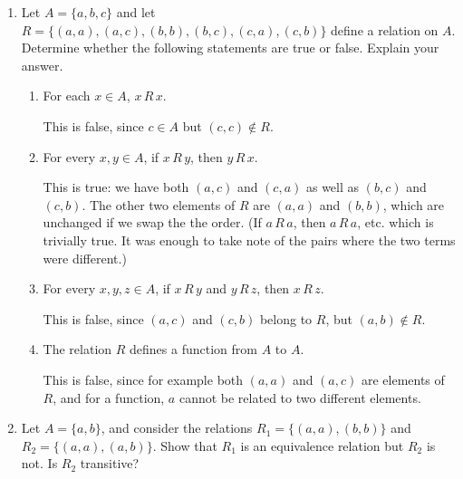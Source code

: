 \documentclass[12pt]{article}
\newcommand{\points}[1]{\marginpar{\hspace{24pt}[#1]}}
\newcommand{\R}[2]{#1\,R\,#2}
\begin{document}
\thispagestyle{fancy}

\bigskip


 \begin{enumerate}
\item Let $A = \{a,b,c\}$ and let $R=\{(a,a), (a,c), (b,b), (b,c), (c,a), (c,b)\}$ define a relation on $A$. Determine whether the following statements are true or false. Explain your answer.
\begin{enumerate}
 \item For each $x\in A$, $\R{x}{x}$. \points{1}

\bigskip

This is false, since $c\in A$ but $(c,c)\notin R$.

\bigskip

 \item For every $x,y\in A$, if $\R{x}{y}$, then $\R{y}{x}$. \points{2}

\bigskip

This is true: we have both $(a,c)$ and $(c,a)$ as well as $(b,c)$ and $(c,b)$. The other two elements of $R$ are $(a,a)$ and $(b,b)$, which are unchanged if we swap the the order. (If $a\,R\,a$, then $a\, R\,a$, etc. which is trivially true. It was enough to take note of the pairs where the two terms were different.)

\bigskip

 \item For every $x,y,z\in A$, if $\R{x}{y}$ and $\R{y}{z}$, then $\R{x}{z}$.\points{2}

\bigskip

This is false, since $(a,c)$ and $(c,b)$ belong to $R$, but $(a,b)\notin R$.

\bigskip

 \item The relation $R$ defines a function from $A$ to $A$. \points{1}

\bigskip

This is false, since for example both $(a,a)$ and $(a,c)$ are elements of $R$, and for a function, $a$ cannot be related to two different elements.

\bigskip

\end{enumerate}


\item Let $A=\{a,b\}$, and consider the relations $R_1=\{(a,a),(b,b)\}$ and $R_2=\{(a,a),(a,b)\}$. Show that $R_1$ is an equivalence relation but $R_2$ is not. Is $R_2$ transitive? \points{4}


\end{enumerate}
\end{document}
